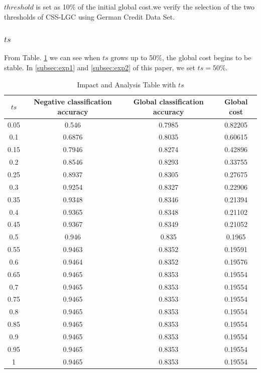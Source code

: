 \documentclass{svjour3}                     %
\begin{document}
$threshold$ is set as 10\% of the initial global cost.we verify the selection of the two thresholds of CSS-LGC using German Credit Data Set.

\subsubsection{$ts$}
From Table. \ref{tab:ts} we can see when $ts$ grows up to 50\%, the global cost begins to be stable. In
\ref{subsec:exp1} and \ref{subsec:exp2} of this paper, we set $ts=50\%$.

\begin{table}[htbp]
  \centering
    \begin{tabular}{c c c c}
    \toprule
    $ts$  & Negative classification accuracy  &  Global classification accuracy & Global cost \\
    \midrule
    0.05  & 0.546 & 0.7985 & 0.82205 \\
    0.1   & 0.6876 & 0.8035 & 0.60615 \\
    0.15  & 0.7946 & 0.8274 & 0.42896 \\
    0.2   & 0.8546 & 0.8293 & 0.33755 \\
    0.25  & 0.8937 & 0.8305 & 0.27675 \\
    0.3   & 0.9254 & 0.8327 & 0.22906 \\
    0.35  & 0.9348 & 0.8346 & 0.21394 \\
    0.4   & 0.9365 & 0.8348 & 0.21102 \\
    0.45  & 0.9367 & 0.8349 & 0.21052 \\
    0.5   & 0.946 & 0.835 & 0.1965 \\
    0.55  & 0.9463 & 0.8352 & 0.19591 \\
    0.6   & 0.9464 & 0.8352 & 0.19576 \\
    0.65  & 0.9465 & 0.8353 & 0.19554 \\
    0.7   & 0.9465 & 0.8353 & 0.19554 \\
    0.75  & 0.9465 & 0.8353 & 0.19554 \\
    0.8   & 0.9465 & 0.8353 & 0.19554 \\
    0.85  & 0.9465 & 0.8353 & 0.19554 \\
    0.9   & 0.9465 & 0.8353 & 0.19554 \\
    0.95  & 0.9465 & 0.8353 & 0.19554 \\
    1     & 0.9465 & 0.8353 & 0.19554 \\
    \bottomrule
    \end{tabular}%
  \caption{Impact and Analysis Table with $ts$} \label{tab:ts}%
\end{table}%
\end{document}
